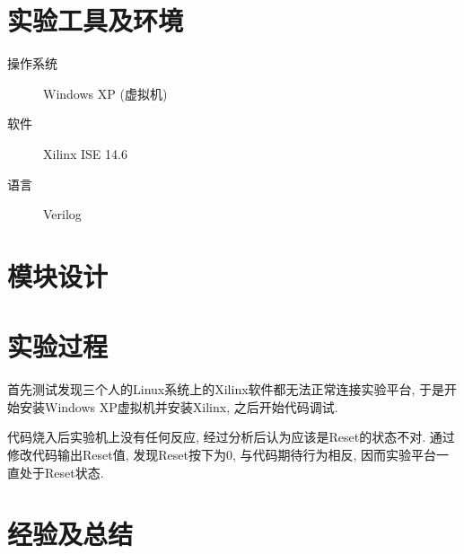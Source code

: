 
\section{实验工具及环境}
\begin{description}
  \item[操作系统] Windows XP (虚拟机)
  \item[软件] Xilinx ISE 14.6
  \item[语言] Verilog
\end{description}

\section{模块设计}


\section{实验过程}
首先测试发现三个人的Linux系统上的Xilinx软件都无法正常连接实验平台,
于是开始安装Windows XP虚拟机并安装Xilinx, 之后开始代码调试.

代码烧入后实验机上没有任何反应, 经过分析后认为应该是Reset的状态不对.
通过修改代码输出Reset值, 发现Reset按下为0, 与代码期待行为相反, 因而实验平台一直处于Reset状态.



\section{经验及总结}
